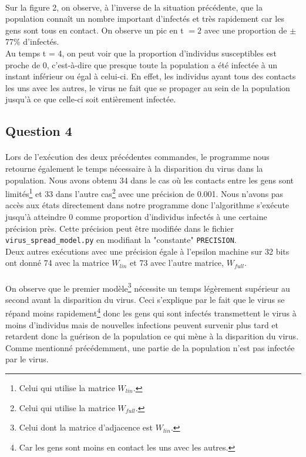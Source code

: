 \documentclass[a4paper, 12pt, oneside]{article}
\begin{document}
\paragraph{}Sur la figure 2, on observe, à l'inverse de la situation précédente, que la population connaît un nombre important d'infectés et très rapidement car les gens sont tous en contact. On observe un pic en t $= 2$ avec une proportion de $\pm$ 77$\%$ d'infectés.\\
Au temps t = 4, on peut voir que la proportion d'individus susceptibles est proche de 0, c'est-à-dire que presque toute la population a été infectée à un instant inférieur ou égal à celui-ci. En effet, les individus ayant tous des contacts les uns avec les autres, le virus ne fait que se propager au sein de la population jusqu'à ce que celle-ci soit entièrement infectée.

\subsection{Question 4}

\paragraph{}Lors de l'exécution des deux précédentes commandes, le programme nous retourne également le temps nécessaire à la disparition du virus dans la population. Nous avons obtenu 34 dans le cas où les contacts entre les gens sont limités\footnote{Celui qui utilise la matrice $W_{lin}$.} et 33 dans l'autre cas\footnote{Celui qui utilise la matrice $W_{full}$.} avec une précision de 0.001. Nous n'avons pas accès aux états directement dans notre programme donc l'algorithme s'exécute jusqu'à atteindre 0 comme proportion d'individus infectés à une certaine précision près. Cette précision peut être modifiée dans le fichier \texttt{virus\_spread\_model.py} en modifiant la "constante" \texttt{PRECISION}.\\
Deux autres exécutions avec une précision égale à l'epsilon machine sur 32 bits ont donné 74 avec la matrice $W_{lin}$ et 73 avec l'autre matrice, $W_{full}$.
\paragraph{}On observe que le premier modèle\footnote{Celui dont la matrice d'adjacence est $W_{lin}$.} nécessite un temps légèrement supérieur au second avant la disparition du virus. Ceci s'explique par le fait que le virus se répand moins rapidement\footnote{Car les gens sont moins en contact les uns avec les autres.} donc les gens qui sont infectés transmettent le virus à moins d'individus mais de nouvelles infections peuvent survenir plus tard et retardent donc la guérison de la population ce qui mène à la disparition du virus. Comme mentionné précédemment, une partie de la population n'est pas infectée par le virus.
\end{document}
